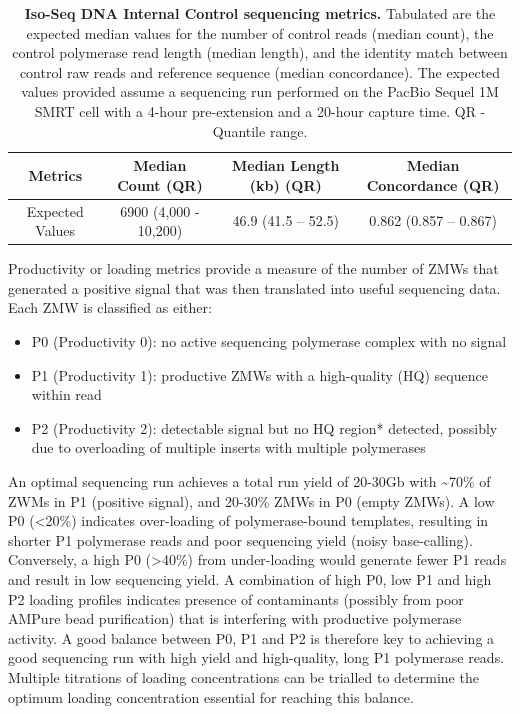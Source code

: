 \vspace{1cm}
\begin{table}[!h]
    \setlength\tabcolsep{4pt} %
	\caption[Iso-Seq DNA Internal Control sequencing metrics]%
	{\textbf{Iso-Seq DNA Internal Control sequencing metrics.} Tabulated are the expected median values for the number of control reads (median count), the control polymerase read length (median length), and the identity match between control raw reads and reference sequence (median concordance). The expected values provided assume a sequencing run performed on the PacBio Sequel 1M SMRT cell with a 4-hour pre-extension and a 20-hour capture time. QR - Quantile range.}	\label{tab:control_Isoseqmetrics}
	
	\centering
	\begin{tabular}{@{}cccc@{}}
		\toprule
		Metrics         & Median Count (QR)     & Median Length (kb) (QR) & Median Concordance (QR) \\ \midrule
		Expected Values & 6900 (4,000 - 10,200) & 46.9 (41.5 – 52.5) & 0.862 (0.857 – 0.867)   \\ \bottomrule
	\end{tabular}
\end{table}


Productivity or loading metrics provide a measure of the number of ZMWs that generated a positive signal that was then translated into useful sequencing data. Each ZMW is classified as either: 
\begin{itemize}
	\item P0 (Productivity 0): no active sequencing polymerase complex with no signal 
	\item P1 (Productivity 1): productive ZMWs with a high-quality (HQ) sequence within read
	\item P2 (Productivity 2): detectable signal but no HQ region* detected, possibly due to overloading of multiple inserts with multiple polymerases
\end{itemize}

An optimal sequencing run achieves a total run yield of 20-30Gb with \textasciitilde70\% of ZWMs in P1 (positive signal), and 20-30\% ZMWs in P0 (empty ZMWs). A low P0 (<20\%) indicates over-loading of polymerase-bound templates, resulting in shorter P1 polymerase reads and poor sequencing yield (noisy base-calling). Conversely, a high P0 (>40\%) from under-loading would generate fewer P1 reads and result in low sequencing yield. A combination of high P0, low P1 and high P2 loading profiles indicates presence of contaminants (possibly from poor AMPure bead purification) that is interfering with productive polymerase activity. A good balance between P0, P1 and P2 is therefore key to achieving a good sequencing run with high yield and high-quality, long P1 polymerase reads. Multiple titrations of loading concentrations can be trialled to determine the optimum loading concentration essential for reaching this balance. 

